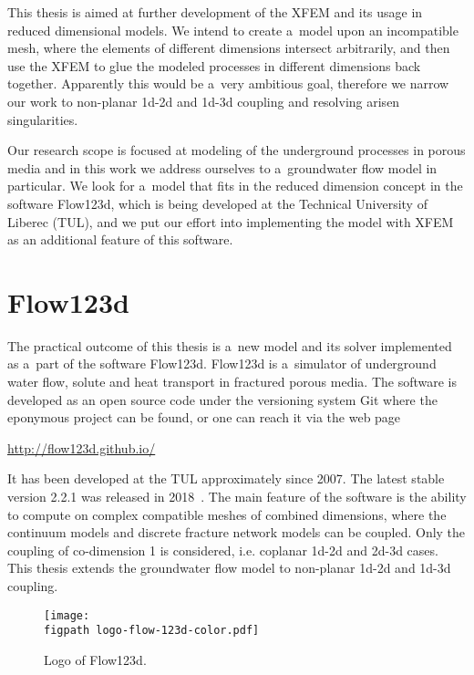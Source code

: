 This thesis is aimed at further development of the XFEM and its usage in reduced dimensional models. 
We intend to create a~model upon an incompatible mesh, where the elements of different dimensions intersect
arbitrarily, and then use the XFEM to glue the modeled processes in different dimensions back together. 
Apparently this would be a~very ambitious goal, therefore we narrow our work to non-planar 1d-2d and 1d-3d coupling
and resolving arisen singularities. 

Our research scope is focused at modeling of the underground processes in porous media
and in this work we address ourselves to a~groundwater flow model in particular.
We look for a~model that fits in the reduced dimension concept in the software Flow123d, which is being developed at the
Technical University of Liberec (TUL), and we put our effort into implementing the model with XFEM as an additional feature of this software.


\section{Flow123d}
\label{sec:soa_flow123d}

The practical outcome of this thesis is a~new model and its solver implemented as a~part of the software Flow123d.
Flow123d is a~simulator of underground water flow, solute and heat transport in fractured porous media. The software is
developed as an open source code under the versioning system Git where the eponymous project can be found, or 
one can reach it via the web page %
%
\begin{center}
\url{http://flow123d.github.io/}
\end{center}

It has been developed at the TUL approximately since 2007.
The latest stable version 2.2.1 was released in 2018~\cite{flow123d}.
The main feature of the software is the ability to compute on complex compatible meshes of combined dimensions,
where the continuum models and discrete fracture network models can be coupled. Only the coupling of co-dimension 1
is considered, i.e. coplanar 1d-2d and 2d-3d cases.
This thesis extends the groundwater flow model to non-planar 1d-2d and 1d-3d coupling.
%
\begin{figure}[!htb]
  \centering
  \texttt{[image: \\figpath logo-flow-123d-color.pdf]}
  \caption{Logo of Flow123d.}
  \label{fig:logo_flow123d}
\end{figure}

